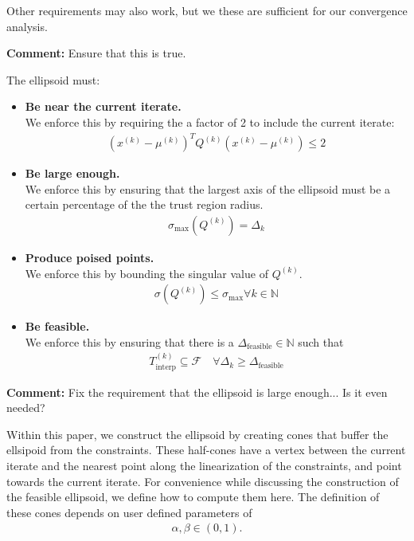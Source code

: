 \documentclass{article}
\newenvironment{comment}
  {\par\medskip
   \color{red}%
   \begin{framed}
   \textbf{Comment: }\ignorespaces}
 {\end{framed}
  \medskip}
\theoremstyle{case}
\newcommand{\xk}{{x^{(k)}}}
\newcommand{\dk}{\Delta_k}
\newcommand{\qk}{{Q^{(k)}}}
\newcommand{\sampletrk}{{T_{\text{interp}}^{(k)}}}
\newcommand{\feasible}{{\mathcal F}}
\newcommand{\ints}{\mathbb N} %
\newcommand{\centerk}{{\mu^{(k)}}}
\newcommand{\sigmamax}{{\sigma_{\text{max}}}}
\newcommand{\deltafeasible}{{\Delta_{\text{feasible}}}}
\begin{document}
Other requirements may also work, but we these are sufficient for our convergence analysis.
\begin{comment}
Ensure that this is true.
\end{comment}
The ellipsoid must:
\begin{itemize}
        \item \textbf{Be near the current iterate.}\\
We enforce this by requiring the a factor of 2 to include the current iterate:
\begin{align}
\label{ellipsoid_close_enough}
(\xk - \centerk)^T \qk(\xk - \centerk) \le 2
\end{align}
        \item \textbf{Be large enough.} \\
        We enforce this by ensuring that the largest axis of the ellipsoid must be a certain percentage of the the trust region radius.
\begin{align}
\label{ellipsoid_large_enough}
\sigma_{\text{max}}(\qk) = \dk
\end{align}
	\item \textbf{Produce poised points.} \\
	We enforce this by bounding the singular value of $\qk$.
\begin{align}
\label{bounded_singular_value}
\sigma(\qk) \le \sigmamax \forall k \in \ints
\end{align}
	\item \textbf{Be feasible.} \\
	We enforce this by ensuring that there is a $\deltafeasible\in\ints$ such that 
\begin{align}
\label{feasible_sample_region}
\sampletrk \subseteq \feasible \quad \forall \dk \ge \deltafeasible
\end{align}
\end{itemize}

\begin{comment}
Fix the requirement that the ellipsoid is large enough...
Is it even needed?
\end{comment}


Within this paper, we construct the ellipsoid by creating cones that buffer the ellsipoid from the constraints.
These half-cones have a vertex between the current iterate and the nearest point along the linearization of the constraints, and point towards the current iterate.
For convenience while discussing the construction of the feasible ellipsoid, we define how to compute them here.
The definition of these cones depends on user defined parameters of 
\begin{align}
\alpha, \beta \in (0, 1) \label{def_alpha_beta}.
\end{align}
\end{document}
